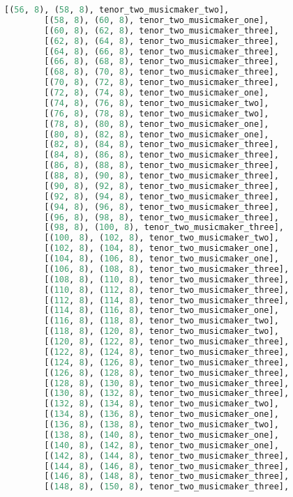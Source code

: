 \begin{lstlisting}[language=Python, caption=Invocation Source Code]
        [(56, 8), (58, 8), tenor_two_musicmaker_two],
        [(58, 8), (60, 8), tenor_two_musicmaker_one],
        [(60, 8), (62, 8), tenor_two_musicmaker_three],
        [(62, 8), (64, 8), tenor_two_musicmaker_three],
        [(64, 8), (66, 8), tenor_two_musicmaker_three],
        [(66, 8), (68, 8), tenor_two_musicmaker_three],
        [(68, 8), (70, 8), tenor_two_musicmaker_three],
        [(70, 8), (72, 8), tenor_two_musicmaker_three],
        [(72, 8), (74, 8), tenor_two_musicmaker_one],
        [(74, 8), (76, 8), tenor_two_musicmaker_two],
        [(76, 8), (78, 8), tenor_two_musicmaker_two],
        [(78, 8), (80, 8), tenor_two_musicmaker_one],
        [(80, 8), (82, 8), tenor_two_musicmaker_one],
        [(82, 8), (84, 8), tenor_two_musicmaker_three],
        [(84, 8), (86, 8), tenor_two_musicmaker_three],
        [(86, 8), (88, 8), tenor_two_musicmaker_three],
        [(88, 8), (90, 8), tenor_two_musicmaker_three],
        [(90, 8), (92, 8), tenor_two_musicmaker_three],
        [(92, 8), (94, 8), tenor_two_musicmaker_three],
        [(94, 8), (96, 8), tenor_two_musicmaker_three],
        [(96, 8), (98, 8), tenor_two_musicmaker_three],
        [(98, 8), (100, 8), tenor_two_musicmaker_three],
        [(100, 8), (102, 8), tenor_two_musicmaker_two],
        [(102, 8), (104, 8), tenor_two_musicmaker_one],
        [(104, 8), (106, 8), tenor_two_musicmaker_one],
        [(106, 8), (108, 8), tenor_two_musicmaker_three],
        [(108, 8), (110, 8), tenor_two_musicmaker_three],
        [(110, 8), (112, 8), tenor_two_musicmaker_three],
        [(112, 8), (114, 8), tenor_two_musicmaker_three],
        [(114, 8), (116, 8), tenor_two_musicmaker_one],
        [(116, 8), (118, 8), tenor_two_musicmaker_two],
        [(118, 8), (120, 8), tenor_two_musicmaker_two],
        [(120, 8), (122, 8), tenor_two_musicmaker_three],
        [(122, 8), (124, 8), tenor_two_musicmaker_three],
        [(124, 8), (126, 8), tenor_two_musicmaker_three],
        [(126, 8), (128, 8), tenor_two_musicmaker_three],
        [(128, 8), (130, 8), tenor_two_musicmaker_three],
        [(130, 8), (132, 8), tenor_two_musicmaker_three],
        [(132, 8), (134, 8), tenor_two_musicmaker_two],
        [(134, 8), (136, 8), tenor_two_musicmaker_one],
        [(136, 8), (138, 8), tenor_two_musicmaker_two],
        [(138, 8), (140, 8), tenor_two_musicmaker_one],
        [(140, 8), (142, 8), tenor_two_musicmaker_one],
        [(142, 8), (144, 8), tenor_two_musicmaker_three],
        [(144, 8), (146, 8), tenor_two_musicmaker_three],
        [(146, 8), (148, 8), tenor_two_musicmaker_three],
        [(148, 8), (150, 8), tenor_two_musicmaker_three],

\end{lstlisting}
